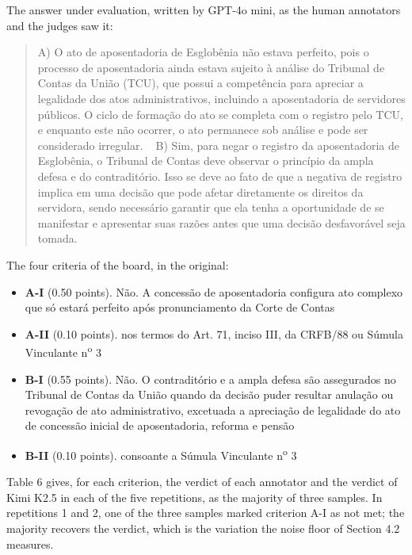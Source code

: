\documentclass{IOS-Book-Article}
\begin{document}
The answer under evaluation, written by GPT-4o mini, as the human annotators and the judges saw it:

\begin{quote}\footnotesize\ttfamily\raggedright
A) O ato de aposentadoria de Esglobênia não estava perfeito, pois o processo de aposentadoria ainda estava sujeito à análise do Tribunal de Contas da União (TCU), que possui a competência para apreciar a legalidade dos atos administrativos, incluindo a aposentadoria de servidores públicos. O ciclo de formação do ato se completa com o registro pelo TCU, e enquanto este não ocorrer, o ato permanece sob análise e pode ser considerado irregular.\newline
~\newline
B) Sim, para negar o registro da aposentadoria de Esglobênia, o Tribunal de Contas deve observar o princípio da ampla defesa e do contraditório. Isso se deve ao fato de que a negativa de registro implica em uma decisão que pode afetar diretamente os direitos da servidora, sendo necessário garantir que ela tenha a oportunidade de se manifestar e apresentar suas razões antes que uma decisão desfavorável seja tomada.
\end{quote}

The four criteria of the board, in the original:

\begin{itemize}
\item \textbf{A-I} (0.50 points). Não. A concessão de aposentadoria configura ato complexo que só estará perfeito após pronunciamento da Corte de Contas
\item \textbf{A-II} (0.10 points). nos termos do Art. 71, inciso III, da CRFB/88 ou Súmula Vinculante n\textsuperscript{o} 3
\item \textbf{B-I} (0.55 points). Não. O contraditório e a ampla defesa são assegurados no Tribunal de Contas da União quando da decisão puder resultar anulação ou revogação de ato administrativo, excetuada a apreciação de legalidade do ato de concessão inicial de aposentadoria, reforma e pensão
\item \textbf{B-II} (0.10 points). consoante a Súmula Vinculante n\textsuperscript{o} 3
\end{itemize}

Table 6 gives, for each criterion, the verdict of each annotator and the verdict of Kimi K2.5 in each of the five repetitions, as the majority of three samples. In repetitions 1 and 2, one of the three samples marked criterion A-I as not met; the majority recovers the verdict, which is the variation the noise floor of Section 4.2 measures.
\end{document}
